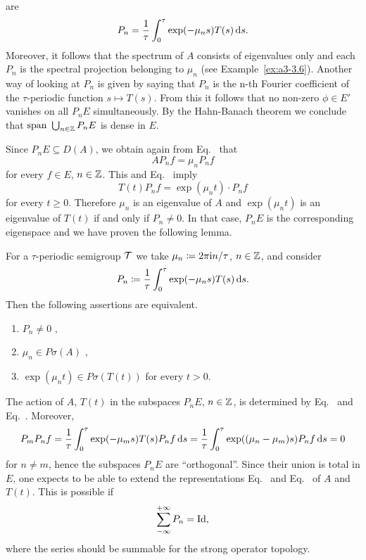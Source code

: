 are
\begin{equation}\label{eq:a3-5.2}
P_{n} = \frac{1}{\tau}\int_{0}^{\tau}\exp(-\mu_{n}s)T(s)  \mathop{}\!\mathrm{d}{s} .
\end{equation}
Moreover, it follows that the spectrum of\/ $A$ consists of eigenvalues only and each $P_{n}$ is the spectral projection belonging to $\mu_{n}$ (see Example~\ref{ex:a3-3.6}). 
Another way of looking at $P_{n}$ is given by saying that $P_{n}$ is the n-th Fourier coefficient of the $\tau$-periodic function $s \mapsto T(s)$.
From this it follows that no non-zero $\phi \in E'$ vanishes on all $P_{n}E$ simultaneously.
By the Hahn-Banach theorem we conclude that $\text{span } \bigcup_{n \in \mathbb{Z}} P_{n}E$ is dense in $E$.

Since $P_{n}E \subseteq D(A)$, we obtain again from Eq.~ that
\begin{equation}\label{eq:a3-5.3}
AP_{n}f = \mu_{n}P_{n}f
\end{equation}
for every $f \in E$, $n \in \mathbb{Z}$.
This and Eq.~ imply
\begin{equation}\label{eq:a3-5.4}
T(t)P_{n}f = \exp(\mu_{n}t) \cdot P_{n}f
\end{equation}
for every $t \geq 0$.
Therefore $\mu_{n}$ is an eigenvalue of\/ $A$ and $\exp(\mu_{n}t)$ is an eigenvalue of\/ $T(t)$ if and only if\/ $P_{n} \neq 0$.
In that case, $P_{n}E$ is the corresponding eigenspace and we have proven the following lemma.
\begin{lemma}\label{lem:a3-5.3}
For a $\tau$-periodic semigroup $\mathcal{T}$ we take $\mu_{n} \coloneq 2\pi\mathrm{i} n/\tau$, $n \in \mathbb{Z}$, and consider
\[
P_{n} \coloneq \frac{1}{\tau}\int_{0}^{\tau} \exp(-\mu_{n}s)T(s)  \mathop{}\!\mathrm{d}{s} .
\]
Then the following assertions are equivalent.
\begin{enumerate}[\upshape (a)]
\item 
$P_{n} \neq 0$ ,

\item 
$\mu_{n} \in P\sigma(A)$ ,

\item 
$\exp(\mu_{n}t) \in P\sigma(T(t))$ for every $t > 0$. 

\end{enumerate}
\end{lemma}
The action of\/ $A$, \resp $T(t)$ in the subspaces $P_{n}E$, $n \in \mathbb{Z}$, is determined by Eq.~ and Eq.~.
Moreover,
\[
	P_{m}P_{n}f =  \frac{1}{\tau}\int_{0}^{\tau} \exp(-\mu_{m}s)T(s)P_{n}f  \mathop{}\!\mathrm{d}{s} 
	=  \frac{1}{\tau}\int_{0}^{\tau} \exp((\mu_{n}-\mu_{m})s)P_{n}f  \mathop{}\!\mathrm{d}{s} = 0
\]
for $n \neq m$, hence the subspaces $P_{n}E$ are \enquote{orthogonal}.
Since their union is total in $E$, one expects to be able to extend the representations Eq.~ and Eq.~ of\/ $A$ and $T(t)$.
This is possible if
\[
	\sum_{-\infty}^{+\infty} P_{n} = \operatorname{Id} ,
\]
where the series should be summable for the strong operator topology.

